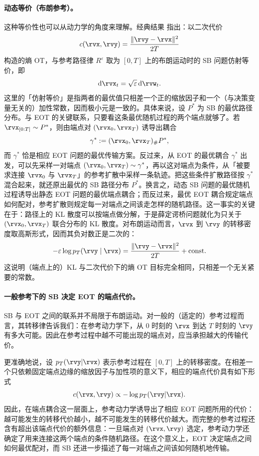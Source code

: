 \paragraph{动态等价（布朗参考）。} 这种等价性也可以从动力学的角度来理解。经典结果 \citep{mikami2006duality} 指出：以二次代价
\[
c(\rvx,\rvy)=\frac{\|\rvy-\rvx\|^2}{2T}
\]
构造的熵 OT，与参考路径律 $R^\varepsilon$ 取为 $[0,T]$ 上的布朗运动时的 SB 问题仿射等价，即
\[
\mathrm{d}\rvx_t=\sqrt{\varepsilon}\,\mathrm{d}\rvw_t.
\]
这里的「仿射等价」是指两者的最优值只相差一个正的缩放因子和一个（与决策变量无关的）加性常数，因而极小元是一致的。具体来说，设 $P^*$ 为 SB 的最优路径分布。与 EOT 的关键联系，只要看这条最优随机过程的两个端点就够了。若
$\rvx_{[0:T]}\sim P^*$，则由端点对
$(\rvx_0,\rvx_T)$ 诱导出耦合
\[
\gamma^*:=(\rvx_0,\rvx_T)_\#P^*,
\]
而 $\gamma^*$ 恰是相应 EOT 问题的最优传输方案。反过来，从 EOT 的最优耦合 $\gamma^*$ 出发，可以先采样一对端点
$(\rvx_0,\rvx_T)\sim\gamma^*$，再以这对端点为条件，从「被要求连接 $\rvx_0$ 与 $\rvx_T$」的参考扩散中采样一条轨迹。把这些条件扩散路径按 $\gamma^*$ 混合起来，就还原出最优的 SB 路径分布 $P^*$。换言之，动态 SB 问题的最优随机过程诱导出静态 EOT 问题的最优端点耦合；而反过来，最优 EOT 耦合规定端点如何配对，参考扩散则规定每一对端点之间该走怎样的随机路径。这一事实的关键在于：路径上的 KL 散度可以按端点做分解，于是薛定谔桥问题就化为只关于 $(\rvx_0,\rvx_T)$ 联合分布的 KL 散度。对布朗运动而言，$\rvx$ 到 $\rvy$ 的转移密度取高斯形式，因而其负对数正是二次的：
\[
-\varepsilon\log p_T(\rvy\mid\rvx)=\frac{\|\rvy-\rvx\|^2}{2T}+\text{const}.
\]
这说明（端点上的）KL 与二次代价下的熵 OT 目标完全相同，只相差一个无关紧要的常数。


\paragraph{一般参考下的 SB 决定 EOT 的端点代价。}
SB 与 EOT 之间的联系并不局限于布朗运动。对一般的（适定的）参考过程而言，其转移律告诉我们：在参考动力学下，从 $0$ 时刻的 $\rvx$ 到达 $T$ 时刻的 $\rvy$ 有多大可能。因此在参考过程中越不可能出现的端点对，应当承担越大的传输代价。

更准确地说，设 $p_T(\rvy|\rvx)$ 表示参考过程在 $[0,T]$ 上的转移密度。在相差一个只依赖固定端点边缘的缩放因子与加性项的意义下，相应的端点代价具有如下形式
\[
c(\rvx,\rvy)
\propto
-\log p_T(\rvy|\rvx).
\]
因此，在端点耦合这一层面上，参考动力学诱导出了相应 EOT 问题所用的代价：越可能发生的转移代价越小，越不可能发生的转移代价越大。而完整的参考过程还含有超出该端点代价的额外信息：一旦端点对 $(\rvx,\rvy)$ 选定，参考动力学还确定了用来连接这两个端点的条件随机路径。在这个意义上，EOT 决定端点之间如何最优配对，而 SB 还进一步描述了每一对端点之间该如何随机地传输。


